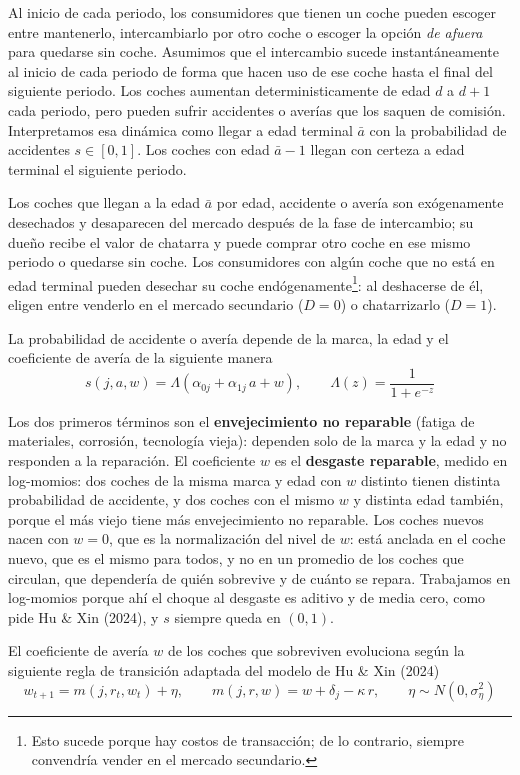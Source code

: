 \documentclass{article}
\begin{document}
Al inicio de cada periodo, los consumidores que tienen un coche pueden escoger entre mantenerlo, intercambiarlo por otro coche o escoger la opción \textit{de afuera} para quedarse sin coche. Asumimos que el intercambio sucede instantáneamente al inicio de cada periodo de forma que hacen uso de ese coche hasta el final del siguiente periodo. Los coches aumentan deterministicamente de edad $d$ a $d+1$ cada periodo, pero pueden sufrir accidentes o averías que los saquen de comisión. Interpretamos esa dinámica como llegar a edad terminal $\bar{a}$ con la probabilidad de accidentes $s\in [0,1]$. Los coches con edad $\bar{a}-1$ llegan con certeza a edad terminal el siguiente periodo.

Los coches que llegan a la edad $\bar{a}$ por edad, accidente o avería son exógenamente desechados y desaparecen del mercado después de la fase de intercambio; su dueño recibe el valor de chatarra y puede comprar otro coche en ese mismo periodo o quedarse sin coche. Los consumidores con algún coche que no está en edad terminal pueden desechar su coche endógenamente\footnote{Esto sucede porque hay costos de transacción; de lo contrario, siempre convendría vender en el mercado secundario.}: al deshacerse de él, eligen entre venderlo en el mercado secundario ($D=0$) o chatarrizarlo ($D=1$).

La probabilidad de accidente o avería depende de la marca, la edad y el coeficiente de avería de la siguiente manera
$$s(j,a,w)=\Lambda\left(\alpha_{0j}+\alpha_{1j}\,a+w\right),\qquad \Lambda(z)=\frac{1}{1+e^{-z}}$$

Los dos primeros términos son el \textbf{envejecimiento no reparable} (fatiga de materiales, corrosión, tecnología vieja): dependen solo de la marca y la edad y no responden a la reparación. El coeficiente $w$ es el \textbf{desgaste reparable}, medido en log-momios: dos coches de la misma marca y edad con $w$ distinto tienen distinta probabilidad de accidente, y dos coches con el mismo $w$ y distinta edad también, porque el más viejo tiene más envejecimiento no reparable. Los coches nuevos nacen con $w=0$, que es la normalización del nivel de $w$: está anclada en el coche nuevo, que es el mismo para todos, y no en un promedio de los coches que circulan, que dependería de quién sobrevive y de cuánto se repara. Trabajamos en log-momios porque ahí el choque al desgaste es aditivo y de media cero, como pide Hu \& Xin (2024), y $s$ siempre queda en $(0,1)$.

El coeficiente de avería $w$ de los coches que sobreviven evoluciona según la siguiente regla de transición adaptada del modelo de Hu \& Xin (2024)
$$w_{t+1}=m(j,r_t,w_t)+\eta ,\qquad m(j,r,w)=w+\delta_j-\kappa\, r,\qquad \eta\sim N(0,\sigma_\eta^2)$$
\end{document}
